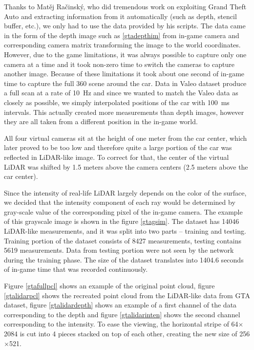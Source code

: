 Thanks to Matěj Račinský, who did tremendous work on exploiting Grand Theft Auto and extracting information from it automatically (such as depth, stencil buffer, etc.), we only had to use the data provided by his scripts. The data came in the form of the depth image such as \ref{gtadepthim} from in-game camera and corresponding camera matrix transforming the image to the world coordinates. However, due to the game limitations, it was always possible to capture only one camera at a time and it took non-zero time to switch the cameras to capture another image. Because of these limitations it took about one second of in-game time to capture the full 360\degree{} scene around the car. Data in Valeo dataset produce a full scan at a rate of 10~Hz and since we wanted to match the Valeo data as closely as possible, we simply interpolated positions of the car with 100~ms intervals. This actually created more measurements than depth images, however they are all taken from a different position in the in-game world.

All four virtual cameras sit at the height of one meter from the car center, which later proved to be too low and therefore quite a large portion of the car was reflected in LiDAR-like image. To correct for that, the center of the virtual LiDAR was shifted by 1.5 meters above the camera centers (2.5 meters above the car center).

Since the intensity of real-life LiDAR largely depends on the color of the surface, we decided that the intensity component of each ray would be determined by gray-scale value of the corresponding pixel of the in-game camera. The example of this grayscale image is shown in the figure \ref{gtagsim}. The dataset has 14046 LiDAR-like measurements, and it was split into two parts -- training and testing. Training portion of the dataset consists of 8427 measurements, testing contains 5619 measurements. Data from testing portion were not seen by the network during the training phase. The size of the dataset translates into 1404.6 seconds of in-game time that was recorded continuously.

Figure \ref{gtafullpcl} shows an example of the original point cloud, figure \ref{gtalidarpcl} shows the recreated point cloud from the LiDAR-like data from GTA dataset, figure \ref{gtalidardepth} shows an example of a first channel of the data corresponding to the depth and figure \ref{gtalidarinten} shows the second channel corresponding to the intensity. To ease the viewing, the horizontal stripe of 64$\times$2084 is cut into 4 pieces stacked on top of each other, creating the new size of 256$\times$521.

